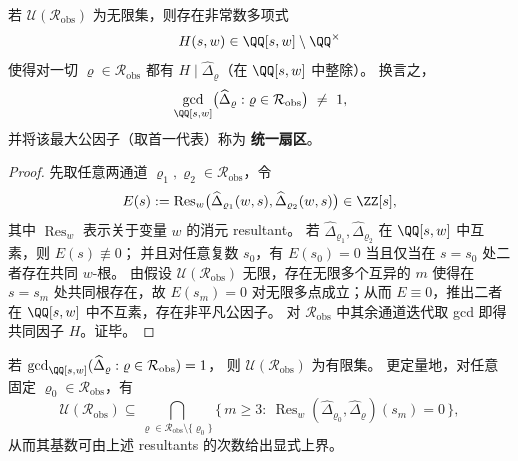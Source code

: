 \begin{theorem}[循环特化刚性：无限多层共同慢模 \texorpdfstring{$\Rightarrow$}{=>} 统一扇区存在]\label{thm:cyclotomic-specialization-rigidity}
若 \(\mathcal{U}(\mathcal{R}_{\mathrm{obs}})\) 为无限集，则存在非常数多项式
\[
H(s,w)\in \QQ[s,w]\setminus\QQ^\times
\]
使得对一切 \(\varrho\in\mathcal{R}_{\mathrm{obs}}\) 都有 \(H\mid \widehat{\Delta}_{\varrho}\)（在 \(\QQ[s,w]\) 中整除）。
换言之，
\[
\gcd_{\QQ[s,w]}\bigl(\widehat{\Delta}_{\varrho}:\varrho\in\mathcal{R}_{\mathrm{obs}}\bigr)\ \neq\ 1,
\]
并将该最大公因子（取首一代表）称为 \textbf{统一扇区}。
\end{theorem}
\begin{proof}
先取任意两通道 \(\varrho_1,\varrho_2\in\mathcal{R}_{\mathrm{obs}}\)，令
\[
E(s):=\operatorname{Res}_{w}\bigl(\widehat{\Delta}_{\varrho_1}(w,s),\widehat{\Delta}_{\varrho_2}(w,s)\bigr)\in\ZZ[s],
\]
其中 \(\operatorname{Res}_{w}\) 表示关于变量 \(w\) 的消元 resultant。
若 \(\widehat{\Delta}_{\varrho_1},\widehat{\Delta}_{\varrho_2}\) 在 \(\QQ[s,w]\) 中互素，则 \(E(s)\not\equiv 0\)；
并且对任意复数 \(s_0\)，有 \(E(s_0)=0\) 当且仅当在 \(s=s_0\) 处二者存在共同 \(w\)-根。
由假设 \(\mathcal{U}(\mathcal{R}_{\mathrm{obs}})\) 无限，存在无限多个互异的 \(m\) 使得在 \(s=s_m\) 处共同根存在，故 \(E(s_m)=0\) 对无限多点成立；从而 \(E\equiv 0\)，推出二者在 \(\QQ[s,w]\) 中不互素，存在非平凡公因子。
对 \(\mathcal{R}_{\mathrm{obs}}\) 中其余通道迭代取 gcd 即得共同因子 \(H\)。证毕。
\end{proof}

\begin{corollary}[有限可证伪性：无统一扇区 \texorpdfstring{$\Rightarrow$}{=>} 共同慢模层必有限]\label{cor:cyclotomic-specialization-falsifiability}
若
\(
\gcd_{\QQ[s,w]}(\widehat{\Delta}_{\varrho}:\varrho\in\mathcal{R}_{\mathrm{obs}})=1
\)，
则 \(\mathcal{U}(\mathcal{R}_{\mathrm{obs}})\) 为有限集。
更定量地，对任意固定 \(\varrho_0\in\mathcal{R}_{\mathrm{obs}}\)，有
\[
\mathcal{U}(\mathcal{R}_{\mathrm{obs}})
\subseteq
\bigcap_{\varrho\in\mathcal{R}_{\mathrm{obs}}\setminus\{\varrho_0\}}
\bigl\{\,m\ge 3:\ \operatorname{Res}_{w}(\widehat{\Delta}_{\varrho_0},\widehat{\Delta}_{\varrho})(s_m)=0\,\bigr\},
\]
从而其基数可由上述 resultants 的次数给出显式上界。
\end{corollary}


